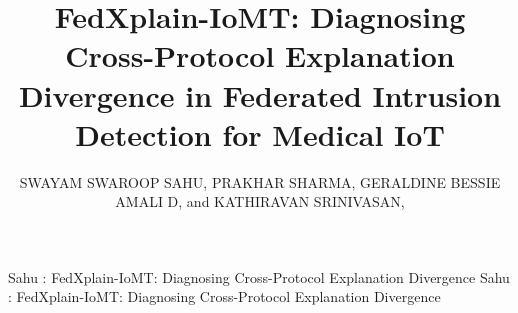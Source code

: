 \documentclass[nolineno]{ieeeaccess}
\begin{document}
\pagestyle{headings}
\def\xfigwd{\columnwidth}
\graphicspath{{figures/}{./}}



\title{FedXplain-IoMT: Diagnosing Cross-Protocol Explanation Divergence in Federated Intrusion Detection for Medical IoT}

\author{\uppercase{Swayam Swaroop Sahu}, 
\uppercase{Prakhar Sharma}, 
\uppercase{Geraldine Bessie Amali D}, 
and \uppercase{Kathiravan Srinivasan}, }

\address[1]{School of Computer Science and Engineering, Vellore Institute of Technology, Vellore 632014, India (e-mail: sahuswayamswaroop@gmail.com; prakhar.sharmaa2019@vitalum.ac.in; geraldine.amali@vit.ac.in; kathiravan.srinivasan@vit.ac.in)}

\markboth
{Sahu \headeretal: FedXplain-IoMT: Diagnosing Cross-Protocol Explanation Divergence}
{Sahu \headeretal: FedXplain-IoMT: Diagnosing Cross-Protocol Explanation Divergence}

\end{document}
